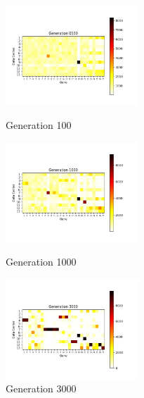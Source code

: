 \documentclass{llncs}
\begin{document}
\begin{figure}[htbp]
\centering
\begin{minipage}[t]{0.3\linewidth}
\centering
\includegraphics[width=5cm]{Figures/Generation 0100.jpg}
\caption{Generation 100}
\label{fig:g100}
\end{minipage}
\begin{minipage}[t]{0.3\linewidth}
\centering
\includegraphics[width=5cm]{Figures/Generation 1000.jpg}
\caption{Generation 1000}
\label{fig:g1000}
\end{minipage}
\begin{minipage}[t]{0.3\linewidth}
\centering
\includegraphics[width=5cm]{Figures/Generation 3000.jpg}
\caption{Generation 3000}
\label{fig:g3000}
\end{minipage}
\end{figure}
\end{document}
